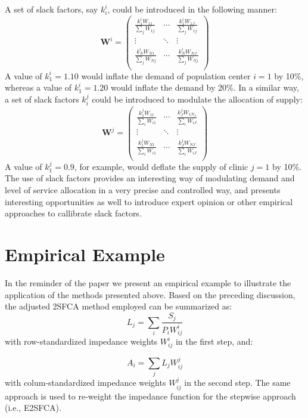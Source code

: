 \documentclass[10pt,letterpaper]{article}
\begin{document}
A set of slack factors, say \(k^i_i\), could be introduced in the
following manner: \[
\mathbf{W}^{i} = \left(\begin{array}{ccc}
            \frac{k^i_1W_{11}}{\sum_jW_{1j}} & \cdots & \frac{k^i_1W_{1J}}{\sum_jW_{1j}}\\
            \vdots & \ddots & \vdots\\
            \frac{k^i_NW_{N1}}{\sum_jW_{Nj}} & \cdots & \frac{k^i_NW_{NJ}}{\sum_jW_{Nj}}\\
        \end{array}
        \right)
\] A value of \(k^i_1=1.10\) would inflate the demand of population
center \(i=1\) by 10\%, whereas a value of \(k^i_1 = 1.20\) would
inflate the demand by 20\%. In a similar way, a set of slack factors
\(k^j_i\) could be introduced to modulate the allocation of supply: \[
\mathbf{W}^{j} = \left(\begin{array}{ccc}
            \frac{k^j_1W_{11}}{\sum_iW_{i1}} & \cdots & \frac{k^j_{J}W_{1N_J}}{\sum_iW_{iJ}}\\
            \vdots & \ddots & \vdots\\
            \frac{k^j_{1}W_{N1}}{\sum_iW_{i1}} & \cdots & \frac{k^j_JW_{NJ}}{\sum_iW_{iJ}}\\
        \end{array}
        \right)
\] A value of \(k^j_1=0.9\), for example, would deflate the supply of
clinic \(j=1\) by 10\%. The use of slack factors provides an interesting
way of modulating demand and level of service allocation in a very
precise and controlled way, and presents interesting opportunities as
well to introduce expert opinion or other empirical approaches to
callibrate slack factors.

\section{Empirical Example}\label{empirical-example}

In the reminder of the paper we present an empirical example to
illustrate the application of the methods presented above. Based on the
preceding discussion, the adjusted 2SFCA method employed can be
summarized as: \[
L_{j}=\sum_i\frac{S_j}{P_iW_{ij}^{i}}
\] with row-standardized impedance weights \(W_{ij}^i\) in the first
step, and:

\[
A_i = \sum_j{L_jW_{ij}^{j}}
\] with colum-standardized impedance weights \(W_{ij}^j\) in the second
step. The same approach is used to re-weight the impedance function for
the stepwise approach (i.e., E2SFCA).
\end{document}
